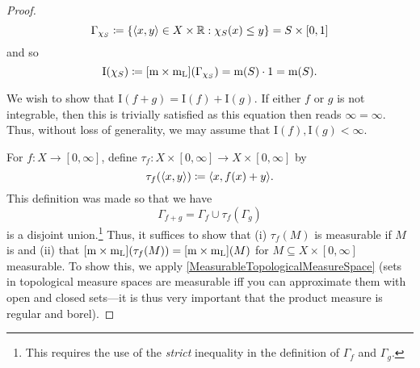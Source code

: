 \begin{thm}[Integral]
\begin{proof}
\begin{equation}
\Gamma _{\chi _S}\coloneqq \left\{ \langle x,y\rangle\in X\times \mathbb{R} :\chi _S(x)\leq y\right\} =S\times [0,1]
\end{equation}
and so
\begin{equation}
\mathrm{I}(\chi _S)\coloneqq [\mathrm{m} \times \mathrm{m} _{\mathrm{L}}](\Gamma _{\chi _S})=\mathrm{m} (S)\cdot 1=\mathrm{m} (S).
\end{equation}

We wish to show that $\mathrm{I}(f+g)=\mathrm{I}(f)+\mathrm{I}(g)$.  If either $f$ or $g$ is not integrable, then this is trivially satisfied as this equation then reads $\infty =\infty$.  Thus, without loss of generality, we may assume that $\mathrm{I}(f),\mathrm{I}(g)<\infty$.

For $f:X\rightarrow [0,\infty ]$, define $\tau _f:X\times [0,\infty ]\rightarrow X\times [0,\infty ]$ by
\begin{equation}
\tau _f(\langle x,y\rangle)\coloneqq \langle x,f(x)+y\rangle.
\end{equation}
This definition was made so that we have
\begin{equation}\label{Pugh3}
\Gamma _{f+g}=\Gamma _f\cup \tau _f(\Gamma _g)
\end{equation}
is a disjoint union.\footnote{This requires the use of the \emph{strict} inequality in the definition of $\Gamma _f$ and $\Gamma _g$.}  Thus, it suffices to show that (i) $\tau _f(M)$ is measurable if $M$ is and (ii) that $[\mathrm{m} \times \mathrm{m} _{\mathrm{L}}](\tau _f(M))=[\mathrm{m} \times \mathrm{m} _{\mathrm{L}}](M)$ for $M\subseteq X\times [0,\infty ]$ measurable.  To show this, we apply \cref{MeasurableTopologicalMeasureSpace} (sets in topological measure spaces are measurable iff you can approximate them with open and closed sets---it is thus very important that the product measure is regular and borel).


\end{proof}
\end{thm}
